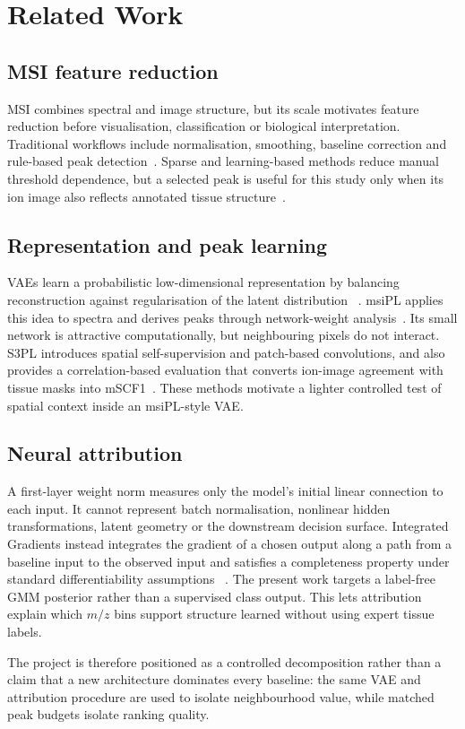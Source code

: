 \section{Related Work}
\label{sec:related_work}

\subsection{MSI feature reduction}

MSI combines spectral and image structure, but its scale motivates feature
reduction before visualisation, classification or biological interpretation.
Traditional workflows include normalisation, smoothing, baseline correction
and rule-based peak detection~\citep{gibb2012maldiquant,deininger2011normalization}.
Sparse and learning-based methods reduce manual threshold dependence, but a
selected peak is useful for this study only when its ion image also reflects
annotated tissue structure~\citep{lieb2020sparse,winderbaum2015feature}.

\subsection{Representation and peak learning}

VAEs learn a probabilistic low-dimensional representation by balancing
reconstruction against regularisation of the latent distribution
~\citep{kingma2014autoencoding}. msiPL applies this idea to spectra and derives
peaks through network-weight analysis~\citep{abdelmoula2021peak}. Its small
network is attractive computationally, but neighbouring pixels do not interact.
S3PL introduces spatial self-supervision and patch-based convolutions, and also
provides a correlation-based evaluation that converts ion-image agreement with
tissue masks into mSCF1~\citep{weigand2026spatial}. These methods motivate a
lighter controlled test of spatial context inside an msiPL-style VAE.

\subsection{Neural attribution}

A first-layer weight norm measures only the model's initial linear connection
to each input. It cannot represent batch normalisation, nonlinear hidden
transformations, latent geometry or the downstream decision surface.
Integrated Gradients instead integrates the gradient of a chosen output along
a path from a baseline input to the observed input and satisfies a completeness
property under standard differentiability assumptions
~\citep{sundararajan2017axiomatic}. The present work targets a label-free GMM
posterior rather than a supervised class output. This lets attribution explain
which $m/z$ bins support structure learned without using expert tissue labels.

The project is therefore positioned as a controlled decomposition rather than
a claim that a new architecture dominates every baseline: the same VAE and
attribution procedure are used to isolate neighbourhood value, while matched
peak budgets isolate ranking quality.
